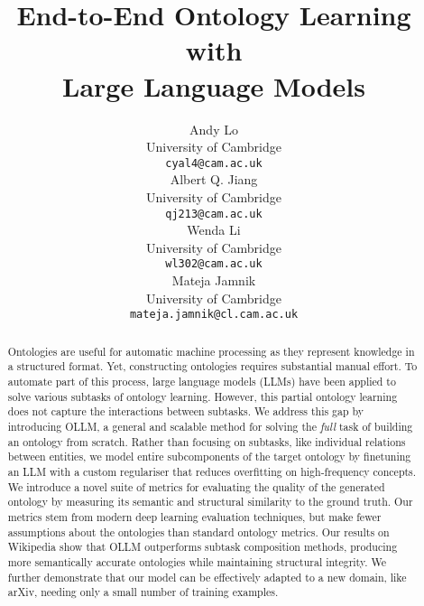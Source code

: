 \documentclass{article}
\title{End-to-End Ontology Learning with \\Large Language Models}
\author{%
    Andy Lo \\
    University of Cambridge\\
    \texttt{cyal4@cam.ac.uk} \\
    Albert Q. Jiang \\
    University of Cambridge\\
    \texttt{qj213@cam.ac.uk} \\
    Wenda Li \\
    University of Cambridge\\
    \texttt{wl302@cam.ac.uk} \\
    Mateja Jamnik \\
    University of Cambridge\\
    \texttt{mateja.jamnik@cl.cam.ac.uk} \\
}
\newcommand{\name}{{OLLM}\xspace}
\begin{document}
\maketitle

\begin{abstract}
Ontologies are useful for automatic machine processing as they represent knowledge in a structured format. Yet, constructing ontologies requires substantial manual effort. To automate part of this process, large language models (LLMs) have been applied to solve various subtasks of ontology learning. However, this partial ontology learning does not capture the interactions between subtasks. 
We address this gap by introducing \name, a general and scalable method for solving the \emph{full} task of building an ontology from scratch.
Rather than focusing on subtasks, like individual relations between entities, we model entire subcomponents of the target ontology by finetuning an LLM with a custom regulariser that reduces overfitting on high-frequency concepts. We introduce a novel suite of metrics for evaluating the quality of the generated ontology by measuring its semantic and structural similarity to the ground truth. Our metrics stem from modern deep learning evaluation techniques, but make fewer assumptions about the ontologies than standard ontology metrics.
Our results on Wikipedia show that \name outperforms subtask composition methods, producing more semantically accurate ontologies while maintaining structural integrity. We further demonstrate that our model can be effectively adapted to a new domain, like arXiv, needing only a small number of training examples. 
\end{abstract}


\end{document}
